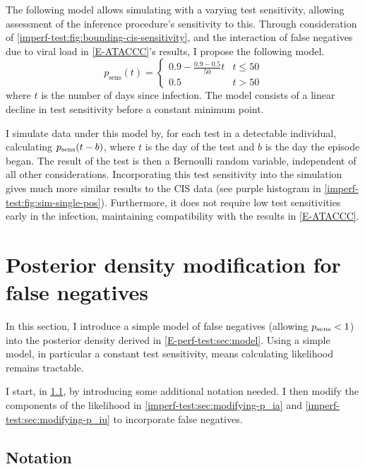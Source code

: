 \documentclass[thesis.tex]{subfiles}
\begin{document}
The following model allows simulating with a varying test sensitivity, allowing assessment of the inference procedure's sensitivity to this.
Through consideration of \cref{imperf-test:fig:bounding-cis-sensitivity}, and the interaction of false negatives due to viral load in \cref{E-ATACCC}'s results, I propose the following model.
\begin{equation}
  p_\text{sens}(t) = \begin{cases}
    0.9 - \frac{0.9-0.5}{50}t &t \leq 50 \\
    0.5 &t > 50
  \end{cases}
  \label{imperf-test:eq:variable-test-sensitivity}
\end{equation}
where $t$ is the number of days since infection.
The model consists of a linear decline in test sensitivity before a constant minimum point.

I simulate data under this model by, for each test in a detectable individual, calculating $p_\text{sens}(t-b)$, where $t$ is the day of the test and $b$ is the day the episode began.
The result of the test is then a Bernoulli random variable, independent of all other considerations.
Incorporating this test sensitivity into the simulation gives much more similar results to the CIS data (see purple histogram in \cref{imperf-test:fig:sim-single-pos}).
Furthermore, it does not require low test sensitivities early in the infection, maintaining compatibility with the results in \cref{E-ATACCC}.

\section{Posterior density modification for false negatives} \label{imperf-test:sec:modelling}

In this section, I introduce a simple model of false negatives (\ie allowing $p_\text{sens} < 1$) into the posterior density derived in \cref{E-perf-test:sec:model}.
Using a simple model, in particular a constant test sensitivity, means calculating likelihood remains tractable.

I start, in \cref{imperf-test:sec:notation}, by introducing some additional notation needed.
I then modify the components of the likelihood in \cref{imperf-test:sec:modifying-p_ia} and \cref{imperf-test:sec:modifying-p_iu} to incorporate false negatives.

\subsection{Notation} \label{imperf-test:sec:notation}
\end{document}
